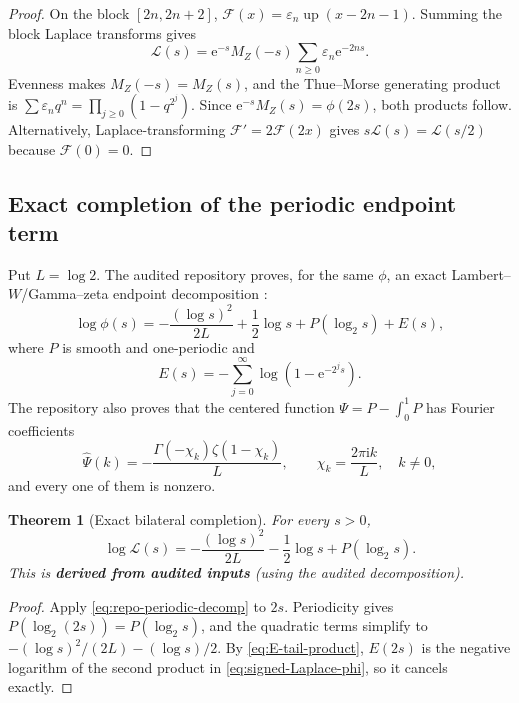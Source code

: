 \documentclass[11pt]{article}
\newcommand{\statusderived}{\textcolor{statusblue}{\textbf{derived from audited inputs}}}
\newtheorem{theorem}{Theorem}[section]
\theoremstyle{definition}
\theoremstyle{remark}
\newcommand{\ii}{\mathrm i}
\newcommand{\e}{\mathrm e}
\newcommand{\Up}{\operatorname{up}}
\newcommand{\extF}{\mathcal F}
\begin{document}
\begin{proof}
On the block $[2n,2n+2]$,
$\extF(x)=\varepsilon_n\Up(x-2n-1)$.  Summing the block Laplace transforms gives
\[
 \mathscr L(s)=\e^{-s}M_Z(-s)\sum_{n\ge0}\varepsilon_n\e^{-2ns}.
\]
Evenness makes $M_Z(-s)=M_Z(s)$, and the Thue--Morse generating product is
$\sum\varepsilon_nq^n=\prod_{j\ge0}(1-q^{2^j})$.  Since
$\e^{-s}M_Z(s)=\phi(2s)$, both products follow.  Alternatively, Laplace-transforming
$\extF'=2\extF(2x)$ gives $s\mathscr L(s)=\mathscr L(s/2)$ because $\extF(0)=0$.
\end{proof}

\subsection{Exact completion of the periodic endpoint term}

Put $L=\log2$.  The audited repository proves, for the same $\phi$, an exact Lambert--$W$/Gamma--zeta
endpoint decomposition \cite{project-primary,project-frontier,corless1996}:
\begin{equation}
 \log\phi(s)=-\frac{(\log s)^2}{2L}+\frac12\log s
 +P(\log_2s)+E(s),
 \label{eq:repo-periodic-decomp}
\end{equation}
where $P$ is smooth and one-periodic and
\begin{equation}
 E(s)=-\sum_{j=0}^{\infty}\log(1-\e^{-2^js}).
 \label{eq:E-tail-product}
\end{equation}
The repository also proves that the centered function
$\Psi=P-\int_0^1P$ has Fourier coefficients
\begin{equation}
 \widehat\Psi(k)=
 -\frac{\Gamma(-\chi_k)\zeta(1-\chi_k)}L,
 \qquad
 \chi_k=\frac{2\pi\ii k}{L},\quad k\ne0,
 \label{eq:Gamma-zeta-Psi}
\end{equation}
and every one of them is nonzero.

\begin{theorem}[Exact bilateral completion]
\label{thm:exact-periodic-completion}
For every $s>0$,
\begin{equation}
 \boxed{
 \log\mathscr L(s)
 =-\frac{(\log s)^2}{2L}-\frac12\log s+P(\log_2s).}
 \label{eq:exact-signed-log}
\end{equation}
This is \statusderived{} (using the audited decomposition).
\end{theorem}

\begin{proof}
Apply \cref{eq:repo-periodic-decomp} to $2s$.  Periodicity gives
$P(\log_2(2s))=P(\log_2s)$, and the quadratic terms simplify to
$-(\log s)^2/(2L)-(\log s)/2$.  By \cref{eq:E-tail-product},
$E(2s)$ is the negative logarithm of the second product in
\cref{eq:signed-Laplace-phi}, so it cancels exactly.
\end{proof}
\end{document}

